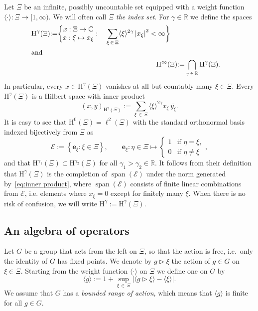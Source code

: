 \documentclass[10pt]{amsart}
\theoremstyle{definition}\newtheorem{defi}[theo]{Definition}\newtheorem{rema}[theo]{Remark}\newtheorem{exam}[theo]{Example}\newtheorem{nota}[theo]{Notation}
\DeclareMathOperator{\spann}{span}
\newcommand{\RH}{\mathrm{H}}
\newcommand{\R}{\mathbb R}
\newcommand{\C}{\mathbb C}
\newcommand{\CE}{\mathcal{E}}
\newcommand{\be}{\mathbf e}
\newcommand{\act}{\triangleright}
\newcommand{\abs}[1]{\left\lvert #1 \right\rvert}
\newcommand{\ang}[1]{\langle #1 \rangle}
\begin{document}
Let $\Xi$ be an infinite, possibly uncountable set equipped with a weight function $\ang \cdot : \Xi \to [1,\infty)$. We will often call $\Xi$ {\emph {the index set}}. For $\gamma \in \R$ we define the spaces
\begin{align}
\begin{split} \RH^{\gamma}(\Xi) &{:=} \bigg\{
\begin{matrix}x: \Xi \to \C\\ \displaystyle x:\xi\mapsto x_\xi
\end{matrix}:\quad \sum_{\xi\,\in\,\Xi}\ang{\xi}^{2\gamma}\abs{x_\xi}^2 < \infty\bigg\}
\end{split}
\\
\intertext{and}
{\RH}^\infty(\Xi) &{:=}\bigcap\limits_{\gamma\,\in\,\R}{\RH}^\gamma(\Xi).
\end{align}
In particular, every $x\in \RH^{\gamma}(\Xi)$ vanishes at all but countably many $\xi\in\Xi$. Every $\RH^{\gamma}(\Xi)$ is a Hilbert space with inner product
\begin{equation}\label{eq:inner product}
\left(x,y \right)_{\RH^\gamma(\Xi)} := \sum_{\xi\,\in\,\Xi}\ang{\xi}^{2\gamma}x_\xi\,\overline{y_\xi}.
\end{equation}
It is easy to see that $\RH^0(\Xi) = \ell^2(\Xi)$ with the standard orthonormal basis indexed bijectively from $\Xi$ as
\begin{equation}
\CE := \left\{\be_{\xi}: \xi \in \Xi\right\}, \qquad \be_{\xi} :\eta\in\Xi\mapsto
\begin{cases}
1 & \text{if }\eta =\xi,\\ 0 & \text{if }\eta\neq\xi
\end{cases},
\end{equation}
and that $\RH^{\gamma_1}(\Xi) \subset \RH^{\gamma_2}(\Xi)$ for all $\gamma_1 >\gamma_2\in\R$. It follows from their definition that $\RH^\gamma(\Xi)$ is the completion of $\spann(\CE)$ under the norm generated by~\eqref{eq:inner product}, where $\spann(\CE)$ consists of finite linear combinations from $\CE$, i.e. elements where $x_\xi = 0$ except for finitely many $\xi$. When there is no risk of confusion, we will write $\RH^\gamma:=\RH^\gamma(\Xi)$.

\subsection{An algebra of operators}

Let $G$ be a group that acts from the left on $\Xi$, so that the action is free, i.e.~only the identity of $G$ has fixed points. We denote by $g\act \xi$ the action of $g\in G$ on $\xi\in\Xi$. Starting from the weight function $\langle\cdot\rangle$ on $\Xi$ we define one on $G$ by
\begin{equation}\label{eq:modulusg}
\ang g := 1 + \sup_{\xi\,\in\,\Xi} \left|\ang{g\act\xi} - \ang{\xi}\right|.
\end{equation}
We assume that $G$ has a \emph{bounded range of action}, which means that $\ang g$ is finite for all $g\in G$.
\end{document}
